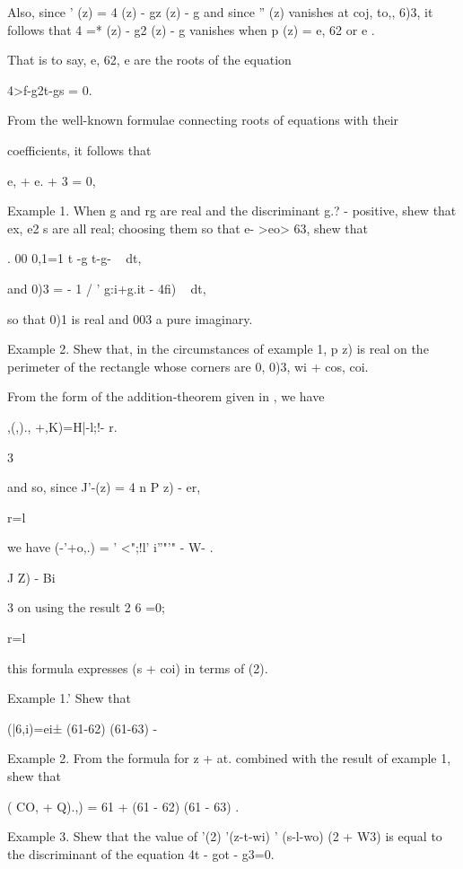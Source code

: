 {Also, since ' (z) = 4 (z) - gz (z) - g and since '' (z) vanishes at
coj, to,, 6)3, it follows that 4 =* (z) - g2 (z) - g vanishes when p
(z) = e, 62 or e .

That is to say, e, 62, e are the roots of the equation

4>f-g2t-gs = 0.

%
%

From the well-known formulae connecting roots of equations with their

coefficients, it follows that

e, + e. + 3 = 0,

Example 1. When g and rg are real and the discriminant g.? - %
positive, shew that ex, e2 s are all real; choosing them so that e-
>eo> 63, shew that

. 00 0,1=1 t -g t-g- ~ dt,

and 0)3 = - 1 / ' g:i+g.it - 4fi) ~ dt,

so that 0)1 is real and 003 a pure imaginary.

Example 2. Shew that, in the circumstances of example 1, p z) is real
on the perimeter of the rectangle whose corners are 0, 0)3, wi +
cos, coi.

From the form of the addition-theorem given in , we have

,(,)., +,K)=H|-l;!- r.

3

and so, since J'-(z) = 4 n P z) - er,

r=l

we have (-'+o,.) = ' <";!l' i''"'" - W- .

 J Z) - Bi

3 on using the result 2 6 =0;

r=l

this formula expresses (s + coi) in terms of (2).

Example 1.' Shew that

  (|6,i)=ei± (61-62) (61-63) -

Example 2. From the formula for z + at. combined with the result of
example 1, shew that

  ( CO, + Q).,) = 61 + (61 - 62) (61 - 63) .


Example 3. Shew that the value of '(2) '(z-t-wi) ' (s-l-wo) (2 + W3)
is equal to the discriminant of the equation 4t - got - g3=0.

}
